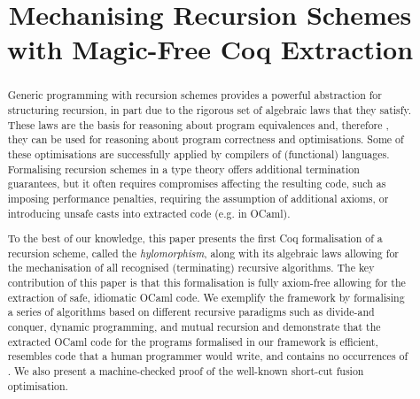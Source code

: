 \documentclass{llncs}
\title{Mechanising Recursion Schemes with Magic-Free Coq Extraction}
\begin{document}
\maketitle

\begin{abstract}
  Generic programming with recursion schemes provides a powerful abstraction for
structuring recursion, in part due to the rigorous set of algebraic laws that
they satisfy. These laws are the basis for reasoning about program equivalences
and, therefore , they can be used for reasoning about program correctness and
optimisations.  Some of these optimisations are successfully applied by
compilers of (functional) languages.  Formalising recursion schemes in a type
theory offers additional termination guarantees, but it often requires
compromises affecting the resulting code, such as imposing performance
penalties, requiring the assumption of additional axioms, or introducing unsafe
casts into extracted code (e.g.  in OCaml).

To the best of our knowledge, this paper presents the first Coq formalisation of
a recursion scheme, called the \emph{hylomorphism}, along with its algebraic
laws allowing for the mechanisation of all recognised (terminating) recursive
algorithms. The key contribution of this paper is that this formalisation is
fully axiom-free allowing for the extraction of safe, idiomatic OCaml code. We
exemplify the framework by formalising a series of algorithms based on different
recursive paradigms such as divide-and conquer, dynamic programming, and mutual
recursion and demonstrate that the extracted OCaml code for the programs
formalised in our framework is efficient, resembles code that a human programmer
would write, and contains no occurrences of .  We also present
a machine-checked proof of the well-known short-cut fusion optimisation.
\end{abstract}
\end{document}
